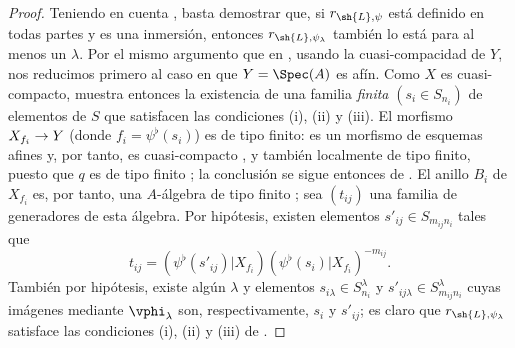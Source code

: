 \documentclass[oneside,10pt]{amsart}
\makeatletter
\newcommand{\ega@arrow}[2]{\mathchoice{#1}{#2}{#2}{#2}}
\renewcommand{\to}{\ega@arrow{\longrightarrow}{\rightarrow}}
\newcommand{\oldpage}[2][]{\marginnote{\normalfont\footnotesize\textbf{#1}~|~#2}\ignorespaces}
\makeatother
\begin{document}
\oldpage[II]{70}
\begin{proof}
Teniendo en cuenta , basta demostrar que, si $r_{\sh{L},\psi}$ está definido en todas partes y es una inmersión, entonces $r_{\sh{L},\psi_\lambda}$ también lo está para al menos un $\lambda$.
Por el mismo argumento que en , usando la cuasi-compacidad de $Y$, nos reducimos primero al caso en que $Y=\Spec(A)$ es afín.
Como $X$ es cuasi-compacto,  muestra entonces la existencia de una familia \emph{finita} $(s_i\in S_{n_i})$ de elementos de $S$ que satisfacen las condiciones (i), (ii) y (iii).
El morfismo $X_{f_i}\to Y$ (donde $f_i=\psi^\flat(s_i)$) es de tipo finito: es un morfismo de esquemas afines y, por tanto, es cuasi-compacto , y también localmente de tipo finito, puesto que $q$ es de tipo finito ; la conclusión se sigue entonces de .
El anillo $B_i$ de $X_{f_i}$ es, por tanto, una $A$-álgebra de tipo finito ;
sea $(t_{ij})$ una familia de generadores de esta álgebra.
Por hipótesis, existen elementos $s'_{ij}\in S_{m_{ij}n_i}$ tales que
\[
  t_{ij} = (\psi^\flat(s'_{ij})|X_{f_i})(\psi^\flat(s_i)|X_{f_i})^{-m_{ij}}.
\]
También por hipótesis, existe algún $\lambda$ y elementos $s_{i\lambda}\in S_{n_i}^\lambda$ y $s'_{ij\lambda}\in S_{m_{ij}n_i}^\lambda$ cuyas imágenes mediante $\vphi_\lambda$ son, respectivamente, $s_i$ y $s'_{ij}$;
es claro que $r_{\sh{L},\psi_\lambda}$ satisface las condiciones (i), (ii) y (iii) de .
\end{proof}
\end{document}
